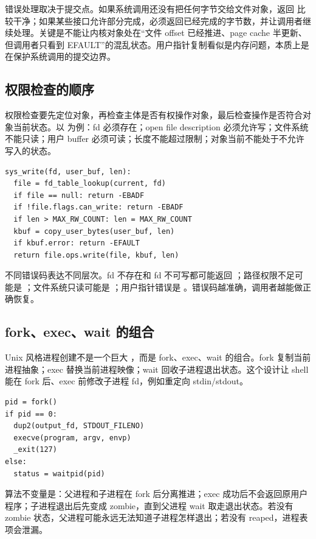 错误处理取决于提交点。如果系统调用还没有把任何字节交给文件对象，返回  比较干净；如果某些接口允许部分完成，必须返回已经完成的字节数，并让调用者继续处理。关键是不能让内核对象处在“文件 offset 已经推进、page cache 半更新、但调用者只看到 EFAULT”的混乱状态。用户指针复制看似是内存问题，本质上是在保护系统调用的提交边界。

\subsection{权限检查的顺序}

权限检查要先定位对象，再检查主体是否有权操作对象，最后检查操作是否符合对象当前状态。以  为例：fd 必须存在；open file description 必须允许写；文件系统不能只读；用户 buffer 必须可读；长度不能超过限制；对象当前不能处于不允许写入的状态。

\begin{lstlisting}
sys_write(fd, user_buf, len):
  file = fd_table_lookup(current, fd)
  if file == null: return -EBADF
  if !file.flags.can_write: return -EBADF
  if len > MAX_RW_COUNT: len = MAX_RW_COUNT
  kbuf = copy_user_bytes(user_buf, len)
  if kbuf.error: return -EFAULT
  return file.ops.write(file, kbuf, len)
\end{lstlisting}

不同错误码表达不同层次。fd 不存在和 fd 不可写都可能返回 ；路径权限不足可能是 ；文件系统只读可能是 ；用户指针错误是 。错误码越准确，调用者越能做正确恢复。

\subsection{fork、exec、wait 的组合}

Unix 风格进程创建不是一个巨大 ，而是 fork、exec、wait 的组合。fork 复制当前进程抽象；exec 替换当前进程映像；wait 回收子进程退出状态。这个设计让 shell 能在 fork 后、exec 前修改子进程 fd，例如重定向 stdin/stdout。

\begin{lstlisting}
pid = fork()
if pid == 0:
  dup2(output_fd, STDOUT_FILENO)
  execve(program, argv, envp)
  _exit(127)
else:
  status = waitpid(pid)
\end{lstlisting}

算法不变量是：父进程和子进程在 fork 后分离推进；exec 成功后不会返回原用户程序；子进程退出后先变成 zombie，直到父进程 wait 取走退出状态。若没有 zombie 状态，父进程可能永远无法知道子进程怎样退出；若没有 reaped，进程表项会泄漏。

